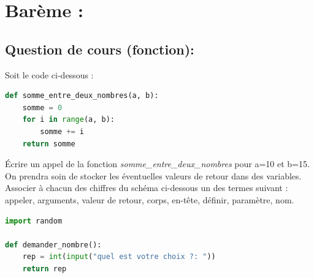 \documentclass[a4paper, noanswers, addpoints, 12pt]{exam}
\begin{document}
\section*{Barème :}
\begin{center}
  \par\bigskip
  \gradetable[h]
\end{center}
\begin{questions}

\vspace{0.5cm}
\section{Question de cours (fonction): }

\question[1\half] Soit le code ci-dessous :
\begin{lstlisting}[style=mystyle, language=Python]
def somme_entre_deux_nombres(a, b):
    somme = 0
    for i in range(a, b):
        somme += i
    return somme
\end{lstlisting}
\question[1]Écrire un appel de la fonction \textit{somme\_entre\_deux\_nombres} pour a=10 et b=15.
On prendra soin de stocker les éventuelles valeurs de retour dans des variables.
\question[4] Associer à chacun des chiffres du schéma ci-dessous un des termes suivant : appeler, arguments, valeur de retour, corps, en-tête, définir, paramètre, nom.
\begin{figure}[h]
    \centering
    
    \label{fig:schema-a-trou}
\end{figure}

\begin{lstlisting}[style=mystyle, language=Python]
import random

def demander_nombre():
    rep = int(input("quel est votre choix ?: "))
    return rep


\end{lstlisting}
\end{questions}
\end{document}

